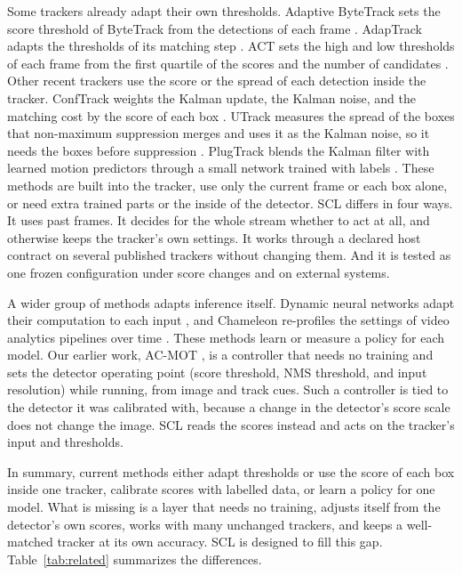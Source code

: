 \documentclass[pdflatex,sn-mathphys-num,iicol]{sn-jnl}
\newcommand{\scl}{SCL}
\begin{document}
Some trackers already adapt their own thresholds. Adaptive ByteTrack sets the
score threshold of ByteTrack from the detections of each frame
\cite{ma2023adaptivebytetrack}. AdapTrack adapts the thresholds of its
matching step \cite{shim2024adaptrack}. ACT sets the high and low thresholds
of each frame from the first quartile of the scores and the number of
candidates \cite{act2026adaptive}. Other recent trackers use the score or the
spread of each detection inside the tracker. ConfTrack weights the Kalman
update, the Kalman noise, and the matching cost by the score of each box
\cite{jung2024conftrack}. UTrack measures the spread of the boxes that
non-maximum suppression merges and uses it as the Kalman noise, so it needs the
boxes before suppression \cite{solano2025utrack}. PlugTrack blends the Kalman
filter with learned motion predictors through a small network trained with
labels \cite{kim2026plugtrack}. These methods are built into the tracker, use
only the current frame or each box alone, or need extra trained parts or the
inside of the detector. \scl{} differs in four ways. It uses past
frames. It decides for the whole stream whether to act at all, and otherwise
keeps the tracker's own settings. It works through a declared host contract
on several published trackers without changing them. And it is tested as one
frozen configuration under score changes and on external systems.

A wider group of methods adapts inference itself. Dynamic neural networks
adapt their computation to each input \cite{han2022dynamic}, and Chameleon
re-profiles the settings of video analytics pipelines over time
\cite{jiang2018chameleon}. These methods learn or measure a policy for each
model. Our earlier work, AC-MOT \cite{ismail2026acmot}, is a controller that
needs no training and sets the detector operating point (score threshold,
NMS threshold, and input resolution) while running, from image and track
cues. Such a controller is tied to the detector it was calibrated with,
because a change in the detector's score scale does not change the image.
\scl{} reads the scores instead and acts on the tracker's input and
thresholds.

In summary, current methods either adapt thresholds or use the score of each
box inside one tracker, calibrate scores with labelled data, or learn a policy
for one model. What is missing is a layer that needs no training, adjusts itself
from the detector's own scores, works with many unchanged trackers, and keeps
a well-matched tracker at its own accuracy. \scl{} is designed to fill this
gap. Table~\ref{tab:related} summarizes the differences.
\end{document}
